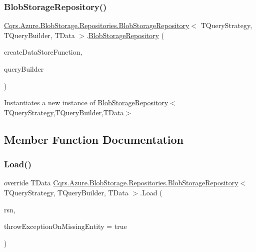 \subsubsection{\texorpdfstring{Blob\+Storage\+Repository()}{BlobStorageRepository()}}
{\footnotesize\ttfamily \hyperlink{classCqrs_1_1Azure_1_1BlobStorage_1_1Repositories_1_1BlobStorageRepository}{Cqrs.\+Azure.\+Blob\+Storage.\+Repositories.\+Blob\+Storage\+Repository}$<$ T\+Query\+Strategy, T\+Query\+Builder, T\+Data $>$.\hyperlink{classCqrs_1_1Azure_1_1BlobStorage_1_1Repositories_1_1BlobStorageRepository}{Blob\+Storage\+Repository} (\begin{DoxyParamCaption}\item[{Func$<$ \hyperlink{interfaceCqrs_1_1DataStores_1_1IDataStore}{I\+Data\+Store}$<$ T\+Data $>$$>$}]{create\+Data\+Store\+Function,  }\item[{T\+Query\+Builder}]{query\+Builder }\end{DoxyParamCaption})}



Instantiates a new instance of \hyperlink{classCqrs_1_1Azure_1_1BlobStorage_1_1Repositories_1_1BlobStorageRepository_a11ec03d2f22e21b2a84556fd26077909_a11ec03d2f22e21b2a84556fd26077909}{Blob\+Storage\+Repository$<$\+T\+Query\+Strategy,\+T\+Query\+Builder,\+T\+Data$>$} 



\subsection{Member Function Documentation}
\mbox{\label{classCqrs_1_1Azure_1_1BlobStorage_1_1Repositories_1_1BlobStorageRepository_a7c5a3ca4d92cf4954508fb3e583eb49e_a7c5a3ca4d92cf4954508fb3e583eb49e}} 
\subsubsection{\texorpdfstring{Load()}{Load()}}
{\footnotesize\ttfamily override T\+Data \hyperlink{classCqrs_1_1Azure_1_1BlobStorage_1_1Repositories_1_1BlobStorageRepository}{Cqrs.\+Azure.\+Blob\+Storage.\+Repositories.\+Blob\+Storage\+Repository}$<$ T\+Query\+Strategy, T\+Query\+Builder, T\+Data $>$.Load (\begin{DoxyParamCaption}\item[{Guid}]{rsn,  }\item[{bool}]{throw\+Exception\+On\+Missing\+Entity = {\ttfamily true} }\end{DoxyParamCaption})\hspace{0.3cm}{\ttfamily [virtual]}}



